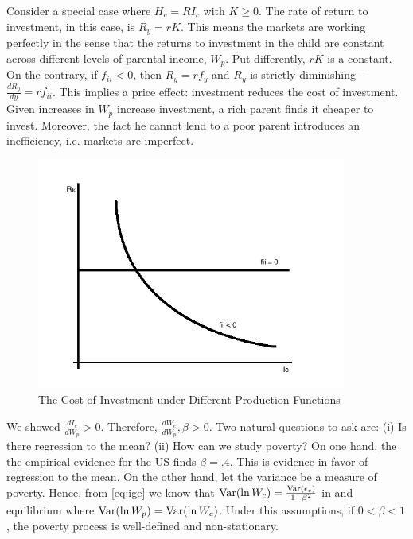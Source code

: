 \indent Consider a special case where $H_{c} = R I_{c}$ with $K \geq 0$. The rate of return to investment, in this case, is $R_{y} = rK$. This means the markets are working perfectly in the sense that the returns to investment in the child are constant across different levels of parental income, $W_{p}$. Put differently, $rK$ is a constant. On the contrary, if $f_{ii} < 0$, then $R_{y} = r f_{y}$ and $R_{y}$ is strictly diminishing --$\frac{d R_{y}}{ d y} = r f_{ii}$. This implies a price effect: investment reduces the cost of investment. Given increases in $W_{p}$ increase investment, a rich parent finds it cheaper to invest. Moreover, the fact he cannot lend to a poor parent introduces an inefficiency, i.e. markets are imperfect.

\begin{center}
\begin{figure}[H] 
\caption{The Cost of Investment under Different Production Functions}
\centering
\includegraphics[width=4in, height=3in]{Plots/Rets.png}
\end{figure}
\end{center}

\indent We showed $\frac{d I_{c}}{d W_{p}} > 0$. Therefore, $\frac{d W_{c}}{d W_{p}}, \beta > 0 $. Two natural questions to ask are: (i) Is there regression to the mean? (ii) How can we study poverty? On one hand, the the empirical evidence for the US finds $\beta = .4$. This is evidence in favor of regression to the mean. On the other hand, let the variance be a measure of poverty. Hence, from \eqref{eq:ige} we know that $\operatorname{Var} (\ln W_{c}) = \frac{\operatorname{Var} (\epsilon_{c})}{1 - \beta^2}$ in and equilibrium where $\operatorname{Var} (\ln W_{p})  = \operatorname{Var} (\ln W_{c}) $. Under this assumptions, if $0 < \beta < 1$, the poverty process is well-defined and non-stationary. 

